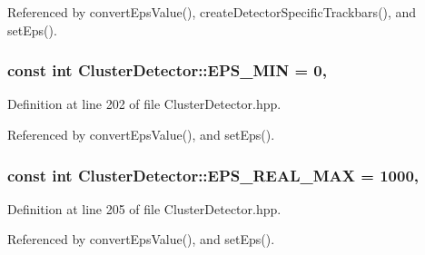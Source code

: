 Referenced by convert\-Eps\-Value(), create\-Detector\-Specific\-Trackbars(), and set\-Eps().

\hypertarget{classmultiscale_1_1analysis_1_1ClusterDetector_a6c3517e03d1fd2c6b4d6cd0d81eb8684}{
\subsubsection[{E\-P\-S\-\_\-\-M\-I\-N}]{\setlength{\rightskip}{0pt plus 5cm}const int Cluster\-Detector\-::\-E\-P\-S\-\_\-\-M\-I\-N = 0\hspace{0.3cm}{\ttfamily [static]}, {\ttfamily [private]}}}\label{classmultiscale_1_1analysis_1_1ClusterDetector_a6c3517e03d1fd2c6b4d6cd0d81eb8684}


Definition at line 202 of file Cluster\-Detector.\-hpp.



Referenced by convert\-Eps\-Value(), and set\-Eps().

\hypertarget{classmultiscale_1_1analysis_1_1ClusterDetector_a3e60b9e068a8addf9dd27382c74e6d62}{
\subsubsection[{E\-P\-S\-\_\-\-R\-E\-A\-L\-\_\-\-M\-A\-X}]{\setlength{\rightskip}{0pt plus 5cm}const int Cluster\-Detector\-::\-E\-P\-S\-\_\-\-R\-E\-A\-L\-\_\-\-M\-A\-X = 1000\hspace{0.3cm}{\ttfamily [static]}, {\ttfamily [private]}}}\label{classmultiscale_1_1analysis_1_1ClusterDetector_a3e60b9e068a8addf9dd27382c74e6d62}


Definition at line 205 of file Cluster\-Detector.\-hpp.



Referenced by convert\-Eps\-Value(), and set\-Eps().

